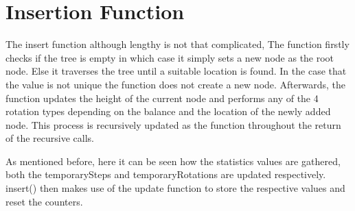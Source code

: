 \documentclass[12pt, a4paper]{report}
\begin{document}
\section{Insertion Function}

The insert function although lengthy is not that complicated, The function firstly checks if the tree is empty in which case it simply sets a new node as the root node. Else it traverses the tree until a suitable location is found. In the case that the value is not unique the function does not create a new node. Afterwards, the function updates the height of the current node and performs any of the 4 rotation types depending on the balance and the location of the newly added node. This process is recursively updated as the function throughout the return of the recursive calls.

As mentioned before, here it can be seen how the statistics values are gathered, both the temporarySteps and temporaryRotations are updated respectively. insert() then makes use of the update function to store the respective values and reset the counters.
\end{document}
